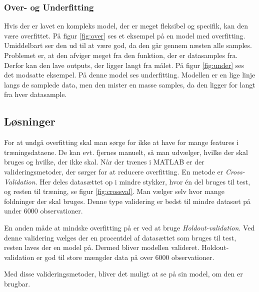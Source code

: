 \subsubsection{Over- og Underfitting}
Hvis der er lavet en kompleks model, der er meget fleksibel og specifik, kan den være overfittet. På figur \ref{fig:over}\citep{fitting} ses et eksempel på en model med overfitting. Umiddelbart ser den ud til at være god, da den går gennem næsten alle samples. Problemet er, at den afviger meget fra den funktion, der er datasamples fra. Derfor kan den lave outputs, der ligger langt fra målet. På figur \ref{fig:under} ses det modsatte eksempel. På denne model ses underfitting. Modellen er en lige linje langs de samplede data, men den mister en masse samples, da den ligger for langt fra hver datasample.


\subsection{Løsninger}
For at undgå overfitting skal man sørge for ikke at have for mange features i træningsdataene. De kan evt. fjernes manuelt, så man udvælger, hvilke der skal bruges og hvilke, der ikke skal.
Når der trænes i MATLAB er der valideringsmetoder, der sørger for at reducere overfitting.
En metode er \textit{Cross-Validation}. Her deles datasættet op i mindre stykker, hvor én del bruges til test, og resten til træning, se figur \ref{fig:crossval}. Man vælger selv hvor mange foldninger der skal bruges. Denne type validering er bedst til mindre datasæt på under 6000 observationer.


En anden måde at mindske overfitting på er ved at bruge \textit{Holdout-validation}. Ved denne validering vælges der en procentdel af datasættet som bruges til test, resten laves der en model på. Dermed bliver modellen valideret. Holdout-validation er god til store mængder data på over 6000 observationer.

Med disse valideringsmetoder, bliver det muligt at se på sin model, om den er brugbar.










